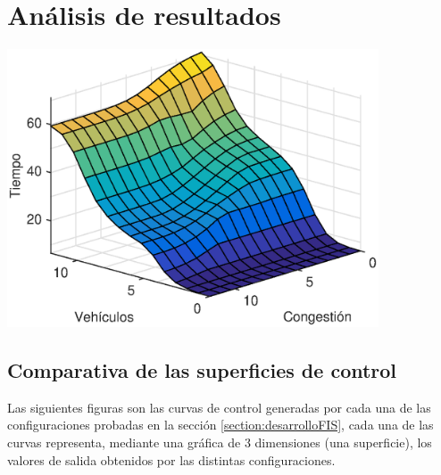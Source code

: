 \chapter{Análisis de resultados}

\begin{center}
	\includegraphics[width=11cm]{Surfaces/surface_d.eps}
	\label{fig:surfaceControl}
\end{center}

\section{Comparativa de las superficies de control}
Las siguientes figuras son las curvas de control generadas por cada una de las configuraciones probadas en la sección \ref{section:desarrolloFIS}, cada una de las curvas representa, mediante una gráfica de 3 dimensiones (una superficie), los valores de salida obtenidos por las distintas configuraciones.

